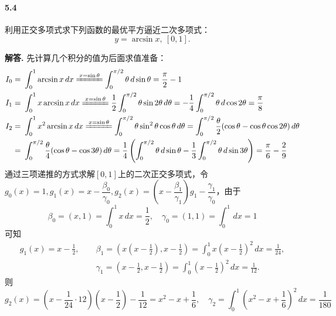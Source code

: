 \documentclass[12pt, a4paper, oneside]{ctexart}
\newenvironment{solution}{\par\noindent\textbf{解答. }}{\bigskip\par}
\begin{document}
\paragraph{5.4}利用正交多项式求下列函数的最优平方逼近二次多项式：
\begin{equation*}
    y = \arcsin x,\ [0,1].
\end{equation*}
\begin{solution}
    先计算几个积分的值为后面求值准备：
    \begin{equation*}
        \begin{aligned}
            I_0=&\ \int_0^1\arcsin x\,dx\xlongequal{x=\sin\theta}\int_0^{\pi/2}\theta\,d\sin\theta=\frac{\pi}{2}-1\\
            I_1=&\ \int_0^1x\arcsin x\,dx\xlongequal{x=\sin\theta}\frac{1}{2}\int_0^{\pi/2}\theta\sin2\theta\,d\theta=-\frac{1}{4}\int_0^{\pi/2}\theta\,d\cos 2\theta=\frac{\pi}{8}\\
            I_2=&\ \int_0^1x^2\arcsin x\,dx\xlongequal{x=\sin\theta}\int_0^{\pi/2}\theta\sin^2\theta\cos\theta\,d\theta=\int_0^{\pi/2}\frac{\theta}{2}(\cos\theta-\cos\theta\cos2\theta)\,d\theta\\
            =&\ \int_0^{\pi/2}\frac{\theta}{4}(\cos\theta-\cos3\theta)\,d\theta=\frac{1}{4}\left(\int_0^{\pi/2}\theta\,d\sin\theta-\frac{1}{3}\int_0^{\pi/2}\theta\,d\sin3\theta\right)=\frac{\pi}{6}-\frac{2}{9}
        \end{aligned}
    \end{equation*}
    通过三项递推的方式求解$[0,1]$上的二次正交多项式，令$g_0(x)=1,g_1(x)=x-\dfrac{\beta_0}{\gamma_0},g_2(x)=(x-\dfrac{\beta_1}{\gamma_1})g_1-\dfrac{\gamma_1}{\gamma_0}$，由于
    \begin{equation*}
        \beta_0=(x,1)=\int_0^1x\,dx=\frac{1}{2},\quad\gamma_0=(1,1)=\int_0^1\,dx=1
    \end{equation*}
    可知
    \begin{equation*}
        \begin{aligned}
            g_1(x)=x-\frac{1}{2},\quad &\ \beta_1=(x(x-\frac{1}{2}),x-\frac{1}{2})=\int_0^1x(x-\frac{1}{2})^2\,dx=\frac{1}{24},\\
            &\ \gamma_1=(x-\frac{1}{2},x-\frac{1}{2})=\int_0^1(x-\frac{1}{2})^2\,dx=\frac{1}{12}.
        \end{aligned}
    \end{equation*}
    则
    \begin{equation*}
        g_2(x) = (x-\frac{1}{24}\cdot 12)(x-\frac{1}{2})-\frac{1}{12} = x^2-x+\frac{1}{6},\quad \gamma_2=\int_0^1(x^2-x+\frac{1}{6})^2\,dx=\frac{1}{180}
    \end{equation*}


\end{solution}
\end{document}
